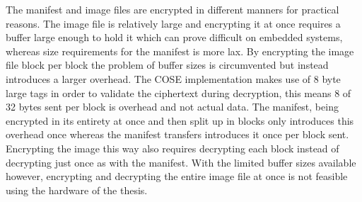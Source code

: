 \documentclass[0-thesis.tex]{subfiles}
\begin{document}
The manifest and image files are encrypted in different manners for practical reasons. The
image file is relatively large and encrypting it at once requires a buffer large enough to
hold it which can prove difficult on embedded systems, whereas size requirements for the
manifest is more lax. By encrypting the image file block per block the problem of buffer
sizes is circumvented but instead introduces a larger overhead. The COSE implementation
makes use of 8 byte large tags in order to validate the ciphertext during decryption, this
means 8 of 32 bytes sent per block is overhead and not actual data. The manifest, being
encrypted in its entirety at once and then split up in blocks only introduces this
overhead once whereas the manifest transfers introduces it once per block sent. Encrypting
the image this way also requires decrypting each block instead of decrypting just once as
with the manifest. With the limited buffer sizes available however, encrypting and
decrypting the entire image file at once is not feasible using the hardware of the thesis.
\end{document}
